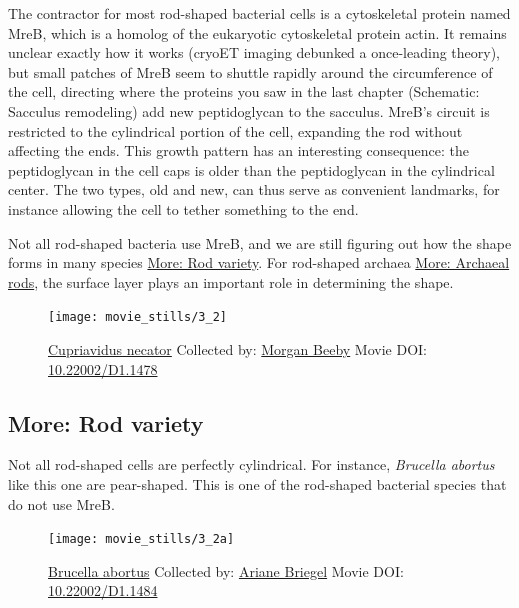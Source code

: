 \documentclass[]{tufte-book}
\begin{document}
The contractor for most rod-shaped bacterial cells is a cytoskeletal
protein named MreB, which is a homolog of the eukaryotic cytoskeletal
protein actin. It remains unclear exactly how it works (cryoET imaging
debunked a once-leading theory), but small patches of MreB seem to
shuttle rapidly around the circumference of the cell, directing where
the proteins you saw in the last chapter (Schematic: Sacculus
remodeling) add new peptidoglycan to the sacculus. MreB's circuit is
restricted to the cylindrical portion of the cell, expanding the rod
without affecting the ends. This growth pattern has an interesting
consequence: the peptidoglycan in the cell caps is older than the
peptidoglycan in the cylindrical center. The two types, old and new, can
thus serve as convenient landmarks, for instance allowing the cell to
tether something to the end.

Not all rod-shaped bacteria use MreB, and we are still figuring out how
the shape forms in many species \protect\hyperlink{Rod_variety}{More:
Rod variety}. For rod-shaped archaea
\protect\hyperlink{Archaeal_rods}{More: Archaeal rods}, the surface
layer plays an important role in determining the shape.





\begin{figure}
\texttt{[image: movie\_stills/3\_2]} \caption[\protect\hyperlink{tree}{Cupriavidus necator} Collected by:
\protect\hyperlink{morgan_beeby}{Morgan Beeby} Movie DOI:
\href{https://doi.org/10.22002/D1.1478}{10.22002/D1.1478}]{\protect\hyperlink{tree}{Cupriavidus necator} Collected by:
\protect\hyperlink{morgan_beeby}{Morgan Beeby} Movie DOI:
\href{https://doi.org/10.22002/D1.1478}{10.22002/D1.1478}}\label{fig:3-2}
\end{figure}

\hypertarget{Rod_variety}{\subsection*{More: Rod
variety}\label{Rod_variety}}

Not all rod-shaped cells are perfectly cylindrical. For instance,
\emph{Brucella abortus} like this one are pear-shaped. This is one of
the rod-shaped bacterial species that do not use MreB.





\begin{figure}
\texttt{[image: movie\_stills/3\_2a]} \caption[\protect\hyperlink{tree}{Brucella abortus} Collected by:
\protect\hyperlink{ariane_briegel}{Ariane Briegel} Movie DOI:
\href{https://doi.org/10.22002/D1.1484}{10.22002/D1.1484}]{\protect\hyperlink{tree}{Brucella abortus} Collected by:
\protect\hyperlink{ariane_briegel}{Ariane Briegel} Movie DOI:
\href{https://doi.org/10.22002/D1.1484}{10.22002/D1.1484}}\label{fig:3-2a}
\end{figure}
\end{document}

